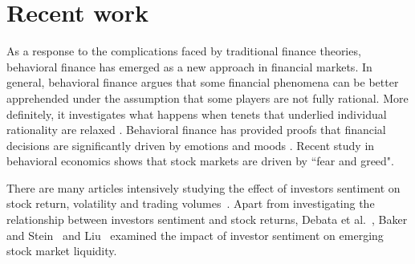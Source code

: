 \documentclass[review,3p,times,12pt,number]{elsarticle}
\begin{document}
\section{Recent work}
\label{sec:weibo:lr}
As a response to the complications faced by traditional finance theories, behavioral finance has emerged as a new approach in financial markets. In general, behavioral finance argues that some financial phenomena can be better apprehended under the assumption that some players are not fully rational. More definitely, it investigates what happens when tenets that underlied individual rationality are relaxed \cite{Barberis2002}. Behavioral finance has provided proofs that financial decisions are significantly driven by emotions and moods \cite{Nofsinger2005}. Recent study in behavioral economics shows that stock markets are driven by ``fear and greed". %
\indent

There are many articles intensively studying the effect of investors sentiment on stock return, volatility and trading volumes~\citep{Sprenger2014Tweets,Nguyen2015Sentiment,Guo2017Can}.
Apart from investigating the relationship between investors sentiment and stock returns, Debata et al.~\cite{Debata2017Investor}, Baker and Stein~\cite{baker2004market} and Liu~\cite{Liu2015Investor} examined the impact of investor sentiment on emerging stock market liquidity.
\end{document}
